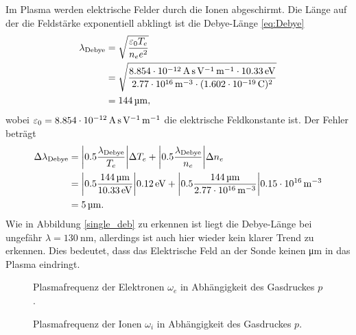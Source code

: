 Im Plasma werden elektrische Felder durch die Ionen abgeschirmt.
Die L\"ange auf der die Feldst\"arke exponentiell abklingt ist die Debye-L\"ange \eqref{eq:Debye}
\begin{align}
\lambda_\text{Debye}
    &=\sqrt{\frac{\varepsilon_0 T_e}{n_e e^2}}
    \label{sdeb}\\
    &=\sqrt{\frac{\sieO \cdot\siATea}{\siAnea\cdot(\sie)^2}} \nonumber\\
    &=\siAdeba\nonumber,
\end{align}
wobei $\varepsilon_0=\SI{8.854e-12}{\ampere\second\per\volt\per\metre}$ die elektrische Feldkonstante ist.
Der Fehler betr\"agt
\begin{align}
\Delta \lambda_\text{Debye}
    &=\abs{0.5\frac{\lambda_\text{Debye}}{T_e}}\Delta T_e + \abs{0.5\frac{\lambda_\text{Debye}}{n_e}}\Delta n_e\\
    &=\abs{0.5\frac{\siAdeba}{\siATea}}\sierrATea + \abs{0.5\frac{\siAdeba}{\siAnea}}\sierrAnea\nonumber\\
    &=\sierrAdeba .\nonumber
\end{align}
Wie in Abbildung \vref{single_deb} zu erkennen ist liegt die Debye-L\"ange bei ungef\"ahr $\lambda =\SI{130}{\nano\metre}$, allerdings ist auch hier wieder kein klarer Trend zu erkennen.
Dies bedeutet, dass das Elektrische Feld an der Sonde keinen \si{\micro\metre} in das Plasma eindringt.

\begin{figure}[htbp]
\centering

\caption{
    Plasmafrequenz der Elektronen $\omega_e$ in Abh\"angigkeit des Gasdruckes $p$.
}
\label{single_wpe}
\end{figure}

\begin{figure}[htbp]
\centering

\caption{
    Plasmafrequenz der Ionen $\omega_i$ in Abh\"angigkeit des Gasdruckes $p$.
}
\label{single_wpi}
\end{figure}

